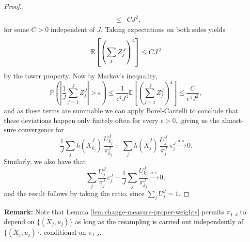 \documentclass[11pt]{article}
\theoremstyle{thmstylethree}%
\begin{document}
\begin{proof}[Proof.]
\begin{eqnarray}
    \\ 
    &\leq& CJ^2,
    \end{eqnarray}
    for some $C>0$ independent of $J$.
    Taking expectations on both sides yields
    \begin{equation}\mathbb{E}\left[\left(\sum_j Z_j^J\right)^4 \right]  \leq CJ^2\end{equation}
    by the tower property. Now by Markov's inequality, 
    \begin{equation}\mathbb{P}\left(\left|\frac{1}{J} \sum_{j=1}^J Z_j^J\right|>\epsilon \right) 
    \leq \frac{1}{\epsilon^4J^4 } 
    \mathbb{E}\left[\left(\sum_{j=1}^J Z_j^J\right)^4\right] \leq \frac{C}{\epsilon^4J^2},\end{equation}
    and as these terms are summable we can apply Borel-Cantelli to conclude that these deviations happen only finitely often for every $\epsilon>0,$ giving us the almost-sure convergence for   
    \begin{equation} 
    \frac1J\sum_j h(\tilde X_{k_j}^J)\, \frac{U_{k_j}^J}{\pi_{k_j}^J}
    -  \sum_j h(\tilde X_j^J)\, \frac{U_j^J}{\pi_j^J}\, \pi_j^J \stackrel{a.s.}{\to} 0.
    \end{equation} 
    Similarly, we also have that
    \begin{equation} 
    \sum_j \frac{U_j^J}{\pi_j^J}\pi_j^J
    - \frac1J\sum_j \frac{U_{k_j}^J}{\pi_{k_j}^J} \stackrel{a.s.}{\to} 0,
    \end{equation}
    and the result follows by taking the ratio, since $\sum_j U_j^J=1$.

    
    
\end{proof}


\noindent \textbf{Remark:} Note that Lemma \ref{lem:change-measure-proper-weights} permits $\pi_{1:J}$ to depend on $\{(X_j,u_j)\}$ as long as the resampling is carried out independently of $\{(X_j,u_j)\}$, conditional on $\pi_{1:J}$.
\end{document}
